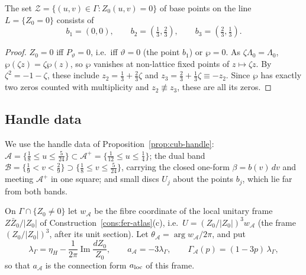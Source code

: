 \begin{lemma}\label{lem:fer-bpoints}
The set $\mathcal Z=\{(u,v)\in\Gamma:Z_0(u,v)=0\}$ of base points on the line $L=\{Z_0=0\}$ consists of
\[
 b_1=(0,0),\qquad b_2=(\tfrac13,\tfrac23),\qquad b_3=(\tfrac23,\tfrac13).
\]
\end{lemma}

\begin{proof}
$Z_0=0$ iff $P_\vartheta=0$, i.e.\ iff $\vartheta=0$ (the point $b_1$) or $\wp=0$. As $\zeta\Lambda_0=\Lambda_0$, $\wp(\zeta z)=\zeta\wp(z)$, so $\wp$ vanishes at non-lattice fixed points of $z\mapsto\zeta z$. By $\zeta^2=-1-\zeta$, these include $z_2=\frac13+\frac23\zeta$ and $z_3=\frac23+\frac13\zeta\equiv-z_2$. Since $\wp$ has exactly two zeros counted with multiplicity and $z_2\not\equiv z_3$, these are all its zeros.
\end{proof}

\subsection{Handle data}\label{sec:fer-handle}

We use the handle data of Proposition~\ref{prop:cub-handle}: $\mathcal A=\{\frac18\le u\le\frac5{24}\}\subset\mathcal A^+=\{\frac1{12}\le u\le\frac14\}$; the dual band $\mathcal B=\{\frac19<v<\frac29\}\supset\{\frac18\le v\le\frac5{24}\}$, carrying the closed one-form $\beta=b(v)\,dv$ and meeting $\mathcal A^+$ in one square; and small discs $U_j$ about the points $b_j$, which lie far from both bands.

\begin{definition}\label{def:fer-frame}
On $\Gamma\cap\{Z_0\ne0\}$ let $w_{\mathcal A}$ be the fibre coordinate of the local unitary frame $Z\bar Z_0/|Z_0|$ of
Construction~\ref{cons:fer-atlas}(c), i.e.\ $U=(Z_0/|Z_0|)^3w_{\mathcal A}$ (the frame $(Z_0/|Z_0|)^3$, after its unit
section). Let $\theta_{\mathcal A}=\arg w_{\mathcal A}/2\pi$, and put
\[
 \lambda_\Gamma=\eta_H-\frac{1}{2\pi}\operatorname{Im}\frac{dZ_0}{Z_0},\qquad a_{\mathcal A}=-3\lambda_\Gamma,\qquad
 \Gamma_{\mathcal A}(p)=(1-3p)\,\lambda_\Gamma ,
\]
so that $a_{\mathcal A}$ is the connection form $a_{\rm loc}$ of this frame.
\end{definition}

